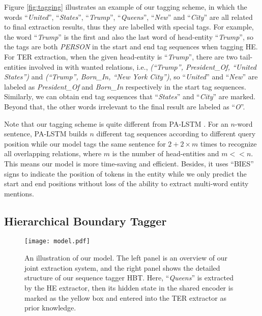 \documentclass{ecai}
\begin{document}
Figure \ref{fig:tagging} illustrates an example of our tagging scheme, in which the words ``\emph{United}'', ``\emph{States}'', ``\emph{Trump}'', ``\emph{Queens}'', ``\emph{New}'' and  ``\emph{City}'' are all related to final extraction results, thus they are labelled with special tags. 
For example, the word ``\emph{Trump}'' is the first and also the last word of head-entity ``\emph{Trump}'', so the tags are both \emph{PERSON} in the start and end tag sequences when tagging HE. 
For TER extraction, when the given head-entity is ``\emph{Trump}'', there are two tail-entities involved in with wanted relations, i.e., \emph{(``Trump'', President\_Of, ``United States'')} and \emph{(``Trump'', Born\_In, ``New York City'')}, so ``\emph{United}'' and ``\emph{New}'' are labeled as \emph{President\_Of} and \emph{Born\_In} respectively in the start tag sequences. Similarly, we can obtain end tag sequences that ``\emph{States}'' and ``\emph{City}'' are marked. 
Beyond that, the other words irrelevant to the final result are labeled as ``\emph{O}''.


Note that our tagging scheme is quite different from PA-LSTM \cite{dai2019joint}. 
For an $n$-word sentence, PA-LSTM builds $n$ different tag sequences according to different query position while our model tags the same sentence for $2+2\times m$ times to recognize all overlapping relations, where $m$ is the number of head-entities and $m<<n$. 
This means our model is more time-saving and efficient. 
Besides, it uses ``BIES''  signs to indicate the position of tokens in the entity while we only predict the start and end positions without loss of the ability to extract multi-word entity mentions.


\subsection{Hierarchical Boundary Tagger}

\begin{figure*}
  \centering
  \texttt{[image: model.pdf]}
    {\caption{An illustration of our model. The left panel is an overview of our joint extraction system, and the right panel shows the detailed structure of our sequence tagger HBT. Here, ``\textit{Queens}'' is extracted by the HE extractor, then its hidden state in the shared encoder is marked as the yellow box and entered into the TER  extractor as prior knowledge.
    }
    \label{fig:system}}
\end{figure*}
\end{document}
